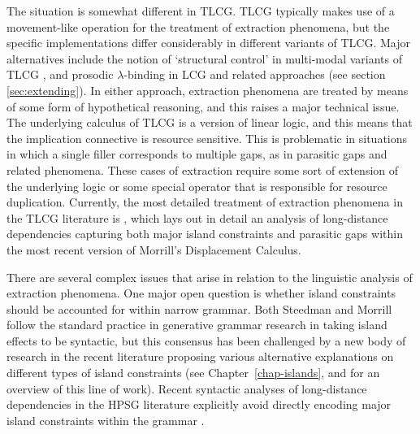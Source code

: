 \documentclass[output=paper]{langsci/langscibook}
\begin{document}
The situation is somewhat different in TLCG. TLCG typically makes use
of a movement-like operation for the treatment of extraction
phenomena, but the specific implementations differ considerably in
different variants of TLCG. Major alternatives include the notion of
`structural control' in multi-modal variants of TLCG
\citep{Morrill94a-u,Moortgat2011a-u}, and prosodic $\lambda$-binding in LCG and
related approaches (see section \ref{sec:extending}). In either
approach, extraction phenomena are treated by means of some form of
hypothetical reasoning, and this raises a major technical issue. The
underlying calculus of TLCG is a version of linear logic, and this
means that the implication connective is resource sensitive. This is
problematic in situations in which a single filler corresponds to
multiple gaps, as in parasitic gaps and related phenomena. These cases
of extraction require some sort of extension of the underlying logic
or some special operator that is responsible for resource duplication.
Currently, the most detailed treatment of extraction phenomena in the
TLCG literature is \citet{morrilllp}, which lays out in detail an analysis
of long-distance dependencies capturing both major island constraints
and parasitic gaps within the most recent version of Morrill's
Displacement Calculus.

There are several complex issues that arise in relation to the
linguistic analysis of extraction phenomena. One major open question
is whether island constraints should be accounted for within narrow
grammar. Both Steedman and Morrill follow the standard practice in
generative grammar research in taking island effects to be syntactic,
but this consensus has been challenged by a new body of research in
the recent literature proposing various alternative explanations on
different types of island constraints (see Chapter~\ref{chap-islands}, \citet{levine2017}
and \citet{newmeyer2016} for an overview of this line of work). Recent
syntactic analyses of long-distance dependencies in the HPSG
literature explicitly avoid directly encoding major island constraints
within the grammar \citep{Sag2010b,chaves12b}.
\end{document}
